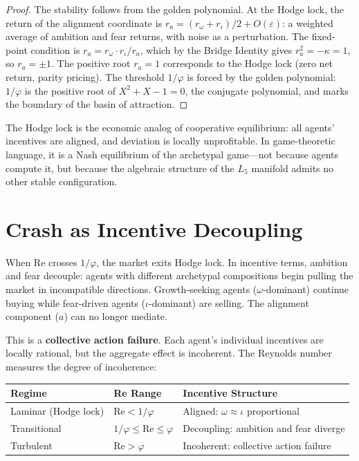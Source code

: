 \begin{proof}
The stability follows from the golden polynomial. At the Hodge lock, the return of the alignment coordinate is $r_a = (r_\omega + r_\iota)/2 + O(\varepsilon)$: a weighted average of ambition and fear returns, with noise as a perturbation. The fixed-point condition is $r_a = r_\omega \cdot r_\iota / r_a$, which by the Bridge Identity gives $r_a^2 = -\kappa = 1$, so $r_a = \pm 1$. The positive root $r_a = 1$ corresponds to the Hodge lock (zero net return, parity pricing). The threshold $1/\varphi$ is forced by the golden polynomial: $1/\varphi$ is the positive root of $X^2 + X - 1 = 0$, the conjugate polynomial, and marks the boundary of the basin of attraction. \qedhere
\end{proof}

The Hodge lock is the economic analog of cooperative equilibrium: all agents' incentives are aligned, and deviation is locally unprofitable. In game-theoretic language, it is a Nash equilibrium of the archetypal game---not because agents compute it, but because the algebraic structure of the $L_5$ manifold admits no other stable configuration.

\section{Crash as Incentive Decoupling}

When Re crosses $1/\varphi$, the market exits Hodge lock. In incentive terms, ambition and fear decouple: agents with different archetypal compositions begin pulling the market in incompatible directions. Growth-seeking agents ($\omega$-dominant) continue buying while fear-driven agents ($\iota$-dominant) are selling. The alignment component ($a$) can no longer mediate.

This is a \textbf{collective action failure}. Each agent's individual incentives are locally rational, but the aggregate effect is incoherent. The Reynolds number measures the degree of incoherence:

\begin{center}
\begin{tabular}{@{}lll@{}}
\toprule
\textbf{Regime} & \textbf{Re Range} & \textbf{Incentive Structure} \\
\midrule
Laminar (Hodge lock) & $\mathrm{Re} < 1/\varphi$ & Aligned: $\omega \approx \iota$ proportional \\
Transitional & $1/\varphi \leq \mathrm{Re} \leq \varphi$ & Decoupling: ambition and fear diverge \\
Turbulent & $\mathrm{Re} > \varphi$ & Incoherent: collective action failure \\
\bottomrule
\end{tabular}
\end{center}

